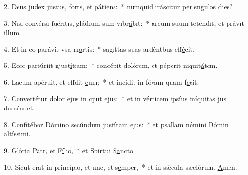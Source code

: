 2. Deus judex justus, forts, et p\uline{á}tiens:~* numquid iráscitur per sngulos d\uline{i}es?\par 
3. Nisi convérsi fuéritis, gládium sum vibr\uline{á}bit:~* arcum suum teténdit, et právit \uline{i}llum.\par 
4. Et in eo parávit vsa m\uline{o}rtis:~* sagíttas suas ardéntbus eff\uline{é}cit.\par 
5. Ecce partúriit njust\uline{í}tiam:~* concépit dolórem, et péperit niquit\uline{á}tem.\par 
6. Lacum apéruit, et effdit \uline{e}um:~* et íncidit in fóvam quam f\uline{e}cit.\par 
7. Convertétur dolor ejus in cput \uline{e}jus:~* et in vérticem ipsíus iníquitas jus desc\uline{é}ndet.\par 
8. Confitébor Dómino secúndum justítam \uline{e}jus:~* et psallam nómini Dómin altíss\uline{i}mi.\par 
9. Glória Patr, et F\uline{í}lio,~* et Spirtui S\uline{a}ncto.\par 
10. Sicut erat in princípio, et nnc, et s\uline{e}mper,~* et in sǽcula sæclórum. \uline{A}men.\par 
